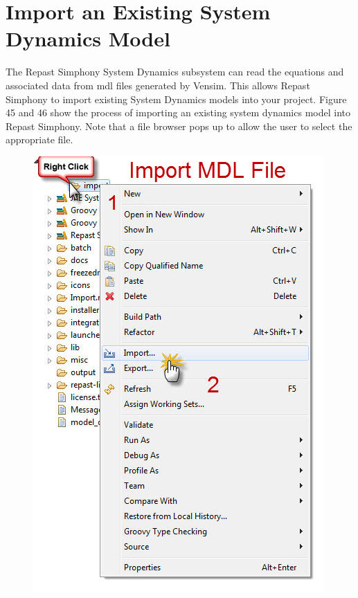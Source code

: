\documentclass[11pt]{amsart}
\begin{document}
\newpage

\section{Import an Existing System Dynamics Model}
The Repast Simphony System Dynamics subsystem can read the equations and associated data from  mdl files generated by Vensim. This allows Repast Simphony to import existing System Dynamics models into your project. Figure 45 and 46 show the process of importing an existing system dynamics model into Repast Simphony. Note that a file browser pops up to allow the user to select the appropriate file.



\begin{figure}[ht]
\begin{center}
\vspace{.2in}
\centerline {
\includegraphics[totalheight=0.6\textheight]{images/045.jpg}
}
\caption{}
\label{fig:045}
\end{center}
\end{figure}
\end{document}
